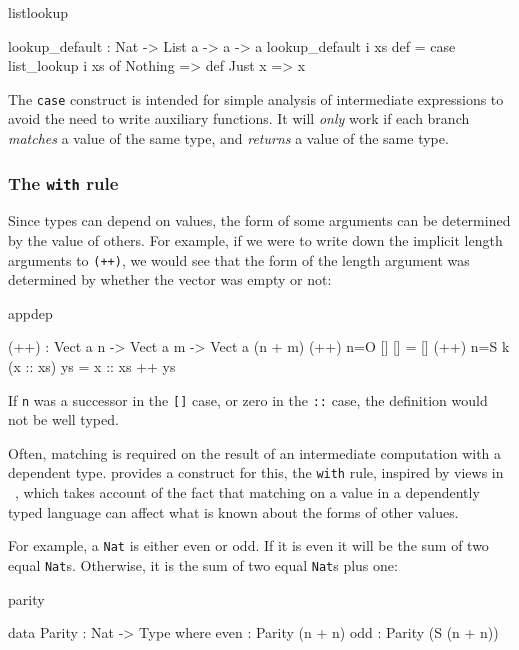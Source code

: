 \begin{SaveVerbatim}{listlookup}

lookup_default : Nat -> List a -> a -> a
lookup_default i xs def = case list_lookup i xs of
                              Nothing => def
                              Just x => x

\end{SaveVerbatim}

The \texttt{case} construct is intended for simple analysis of intermediate
expressions to avoid the need to write auxiliary functions.  It will
\emph{only} work if each branch \emph{matches} a value of the same type, and
\emph{returns} a value of the same type.

\subsubsection{The \texttt{with} rule}

Since types can depend on values, the form of some arguments can be determined
by the value of others. For example, if we were to write down the implicit
length arguments to \texttt{(++)}, we would see that the form of the length argument was
determined by whether the vector was empty or not:

\begin{SaveVerbatim}{appdep}

(++) : Vect a n -> Vect a m -> Vect a (n + m)
(++) {n=O}   []        [] = []
(++) {n=S k} (x :: xs) ys = x :: xs ++ ys

\end{SaveVerbatim}

\noindent
If \texttt{n} was a successor in the \texttt{[]} case, or zero in the 
\texttt{::} case, the definition
would not be well typed.

Often, matching is required on the result of an intermediate computation
with a dependent type.
\Idris{} provides a construct for this, the \texttt{with} rule, 
inspired by views in \Epigram~\cite{McBride2004a},
which takes account of the
fact that matching on a value in a dependently typed language can affect what
is known about the forms of other values. 

For example, a \texttt{Nat} is either even or odd. 
If it is even it will
be the sum of two equal \texttt{Nat}s. Otherwise, it is the sum of two equal \texttt{Nat}s 
plus one:

\begin{SaveVerbatim}{parity}

data Parity : Nat -> Type where
   even : Parity (n + n)
   odd  : Parity (S (n + n))

\end{SaveVerbatim}

